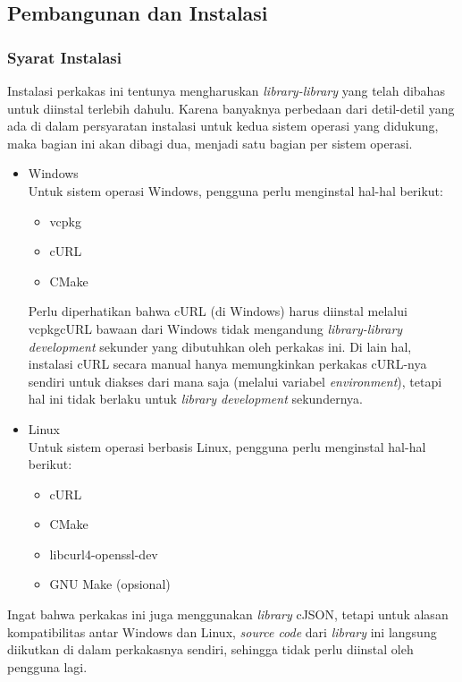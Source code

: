 \subsection{Pembangunan dan Instalasi}
\label{sec:testing-experiments-installation}

\subsubsection{Syarat Instalasi}
\label{sec:testing-experiments-installation-requirements}

Instalasi perkakas ini tentunya mengharuskan \textit{library-library} yang telah dibahas untuk diinstal terlebih dahulu. Karena banyaknya perbedaan dari detil-detil yang ada di dalam persyaratan instalasi untuk kedua sistem operasi yang didukung, maka bagian ini akan dibagi dua, menjadi satu bagian per sistem operasi.

\begin{itemize}
	\item Windows \\
	Untuk sistem operasi Windows, pengguna perlu menginstal hal-hal berikut:
	
	\begin{itemize}
		\item vcpkg
		\item cURL
		\item CMake
	\end{itemize}
	
	Perlu diperhatikan bahwa cURL (di Windows) harus diinstal melalui vcpkg\textemdash cURL bawaan dari Windows tidak mengandung \textit{library-library development} sekunder yang dibutuhkan oleh perkakas ini. Di lain hal, instalasi cURL secara manual hanya memungkinkan perkakas cURL-nya sendiri untuk diakses dari mana saja (melalui variabel \textit{environment}), tetapi hal ini tidak berlaku untuk \textit{library development} sekundernya.
	
	\item Linux \\
	Untuk sistem operasi berbasis Linux, pengguna perlu menginstal hal-hal berikut:
	
	\begin{itemize}
		\item cURL
		\item CMake
		\item libcurl4-openssl-dev
		\item GNU Make (opsional)
	\end{itemize}
	
\end{itemize}
\noindent
Ingat bahwa perkakas ini juga menggunakan \textit{library} cJSON, tetapi untuk alasan kompatibilitas antar Windows dan Linux, \textit{source code} dari \textit{library} ini langsung diikutkan di dalam perkakasnya sendiri, sehingga tidak perlu diinstal oleh pengguna lagi.


